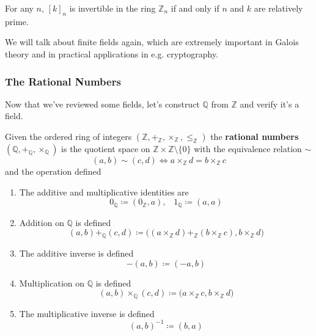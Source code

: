   \begin{corollary}
    For any $n$, $[k]_n$ is invertible in the ring $\mathbb{Z}_n$ if and only if $n$ and $k$ are relatively prime. 
  \end{corollary} 

  We will talk about finite fields again, which are extremely important in Galois theory and in practical applications in e.g. cryptography. 

\subsubsection{The Rational Numbers}

  Now that we've reviewed some fields, let's construct $\mathbb{Q}$ from $\mathbb{Z}$ and verify it's a field. 

  \begin{definition}[Rationals]
    Given the ordered ring of integers $(\mathbb{Z}, +_{\mathbb{Z}}, \times_{\mathbb{Z}}, \leq_{\mathbb{Z}})$ the \textbf{rational numbers} $(\mathbb{Q}, +_{\mathbb{Q}}, \times_{\mathbb{Q}})$ is the quotient space on $\mathbb{Z} \times \mathbb{Z} \setminus \{0\}$ with the equivalence relation $\sim$ 
    \begin{equation}
      (a, b) \sim (c, d) \iff a \times_{\mathbb{Z}} d = b \times_{\mathbb{Z}} c
    \end{equation} 
    and the operation defined 
    \begin{enumerate}
      \item The additive and multiplicative identities are 
      \begin{equation}
        0_{\mathbb{Q}} \coloneqq (0_{\mathbb{Z}}, a), \;\;\; 1_{\mathbb{Q}} \coloneqq (a, a)
      \end{equation}

      \item Addition on $\mathbb{Q}$ is defined 
      \begin{equation}
        (a, b) +_{\mathbb{Q}} (c, d) \coloneqq \big( (a \times_{\mathbb{Z}} d) +_{\mathbb{Z}} (b \times_{\mathbb{Z}} c), b \times_{\mathbb{Z}} d \big) 
      \end{equation}

      \item The additive inverse is defined 
      \begin{equation}
        -(a, b) \coloneqq (-a, b)
      \end{equation}

      \item Multiplication on $\mathbb{Q}$ is defined 
      \begin{equation}
        (a, b) \times_{\mathbb{Q}} (c, d) \coloneqq \big( a \times_{\mathbb{Z}} c, b \times_{\mathbb{Z}} d \big)
      \end{equation} 

      \item The multiplicative inverse is defined 
      \begin{equation}
        (a, b)^{-1} \coloneqq (b, a)
      \end{equation}
    \end{enumerate}
  \end{definition}

